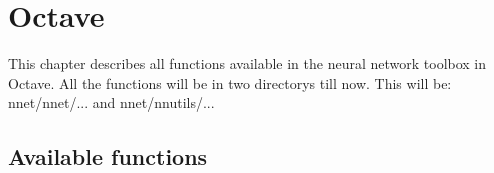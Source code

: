 \chapter{Octave}
This chapter describes all functions available in the neural network toolbox in Octave.
All the functions will be in two directorys till now. This will be: nnet/nnet/... and
nnet/nnutils/...



\section{Available functions}
